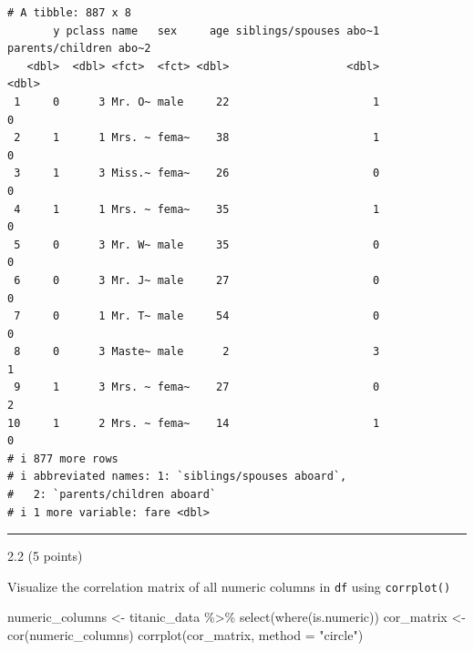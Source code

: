 \documentclass[
  letterpaper,
  DIV=11,
  numbers=noendperiod]{scrartcl}
\newenvironment{Shaded}{\begin{snugshade}}{\end{snugshade}}
\newcommand{\AttributeTok}[1]{\textcolor[rgb]{0.40,0.45,0.13}{#1}}
\newcommand{\FunctionTok}[1]{\textcolor[rgb]{0.28,0.35,0.67}{#1}}
\newcommand{\NormalTok}[1]{\textcolor[rgb]{0.00,0.23,0.31}{#1}}
\newcommand{\OtherTok}[1]{\textcolor[rgb]{0.00,0.23,0.31}{#1}}
\newcommand{\SpecialCharTok}[1]{\textcolor[rgb]{0.37,0.37,0.37}{#1}}
\newcommand{\StringTok}[1]{\textcolor[rgb]{0.13,0.47,0.30}{#1}}
\begin{document}
\begin{verbatim}
# A tibble: 887 x 8
       y pclass name   sex     age siblings/spouses abo~1 parents/children abo~2
   <dbl>  <dbl> <fct>  <fct> <dbl>                  <dbl>                  <dbl>
 1     0      3 Mr. O~ male     22                      1                      0
 2     1      1 Mrs. ~ fema~    38                      1                      0
 3     1      3 Miss.~ fema~    26                      0                      0
 4     1      1 Mrs. ~ fema~    35                      1                      0
 5     0      3 Mr. W~ male     35                      0                      0
 6     0      3 Mr. J~ male     27                      0                      0
 7     0      1 Mr. T~ male     54                      0                      0
 8     0      3 Maste~ male      2                      3                      1
 9     1      3 Mrs. ~ fema~    27                      0                      2
10     1      2 Mrs. ~ fema~    14                      1                      0
# i 877 more rows
# i abbreviated names: 1: `siblings/spouses aboard`,
#   2: `parents/children aboard`
# i 1 more variable: fare <dbl>
\end{verbatim}

\begin{center}\rule{0.5\linewidth}{0.5pt}\end{center}

2.2 (5 points)

Visualize the correlation matrix of all numeric columns in \texttt{df}
using \texttt{corrplot()}

\begin{Shaded}
\begin{Highlighting}[]
\NormalTok{numeric\_columns }\OtherTok{\textless{}{-}}\NormalTok{ titanic\_data }\SpecialCharTok{\%\textgreater{}\%} \FunctionTok{select}\NormalTok{(}\FunctionTok{where}\NormalTok{(is.numeric))}
\NormalTok{cor\_matrix }\OtherTok{\textless{}{-}} \FunctionTok{cor}\NormalTok{(numeric\_columns)}
\FunctionTok{corrplot}\NormalTok{(cor\_matrix, }\AttributeTok{method =} \StringTok{"circle"}\NormalTok{)}
\end{Highlighting}
\end{Shaded}
\end{document}
